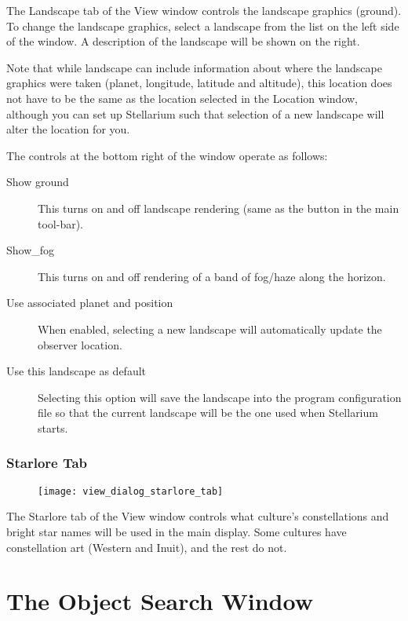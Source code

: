 The Landscape tab of the View window controls the landscape graphics
(ground). To change the landscape graphics, select a landscape from the
list on the left side of the window. A description of the landscape will
be shown on the right.

Note that while landscape can include information about where the
landscape graphics were taken (planet, longitude, latitude and
altitude), this location does not have to be the same as the location
selected in the Location window, although you can set up Stellarium such
that selection of a new landscape will alter the location for you.

The controls at the bottom right of the window operate as follows:

\begin{description}
\item[Show ground] This turns on and off landscape rendering (same
  as the button in the main tool-bar).
\item[Show\_fog] This turns on and off rendering of a band of
  fog/haze along the horizon.
\item[Use associated planet and position] When enabled, selecting a
  new landscape will automatically update the observer location.
\item[Use this landscape as default] Selecting this option will save
  the landscape into the program configuration file so that the current
  landscape will be the one used when Stellarium starts.
\end{description}

\subsubsection{Starlore Tab}\label{starlore-tab}

\begin{figure}[h]
\centering\texttt{[image: view\_dialog\_starlore\_tab]}
\end{figure}

The Starlore tab of the View window controls what culture's
constellations and bright star names will be used in the main display.
Some cultures have constellation art (Western and Inuit), and the rest
do not.


\section{The Object Search Window}
\label{sec:gui:search}


